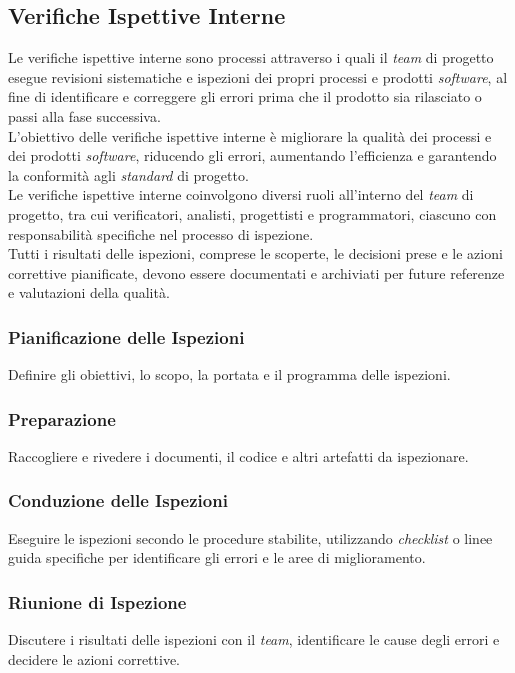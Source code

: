 \subsection{Verifiche Ispettive Interne}
Le verifiche ispettive interne sono processi attraverso i quali il \textit{team} di
progetto esegue revisioni sistematiche e ispezioni dei propri processi e
prodotti \textit{software}, al fine di identificare e correggere gli errori
prima che il prodotto sia rilasciato o passi alla fase successiva.\\
L'obiettivo delle verifiche ispettive interne è migliorare la qualità dei
processi e dei prodotti \textit{software}, riducendo gli errori, aumentando
l'efficienza e garantendo la conformità agli \textit{standard} di progetto.\\
Le verifiche ispettive interne coinvolgono diversi ruoli all'interno del \textit{team}
di progetto, tra cui verificatori, analisti, progettisti e programmatori,
ciascuno con responsabilità specifiche nel processo di ispezione.\\
Tutti i risultati delle ispezioni, comprese le scoperte, le decisioni prese e
le azioni correttive pianificate, devono essere documentati e archiviati per
future referenze e valutazioni della qualità.




\subsubsection{Pianificazione delle Ispezioni} 
Definire gli obiettivi, lo
	  scopo, la portata e il programma delle ispezioni.

\subsubsection{Preparazione} 
Raccogliere e rivedere i documenti, il codice e
	  altri artefatti da ispezionare.

\subsubsection{Conduzione delle Ispezioni} 
Eseguire le ispezioni secondo le
	  procedure stabilite, utilizzando \textit{checklist} o linee guida
	  specifiche per identificare gli errori e le aree di miglioramento.

\subsubsection{Riunione di Ispezione} 
Discutere i risultati delle ispezioni
	  con il \textit{team}, identificare le cause degli errori e decidere le azioni
	  correttive.

